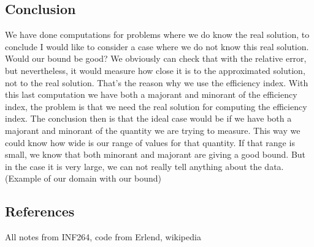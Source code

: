 \documentclass{article}
\begin{document}
	\subsection*{Conclusion}
	We have done computations for problems where we do know the real solution, to conclude I would like to consider a case where we do not know this real solution. Would our bound be good? We obviously can check that with the relative error, but nevertheless, it would measure how close it is to the approximated solution, not to the real solution. That's the reason why we use the efficiency index. With this last computation we have both a majorant and minorant of the efficiency index, the problem is that we need the real solution for computing the efficiency index. The conclusion then is that the ideal case would be if we have both a majorant and minorant of the quantity we are trying to measure. This way we could know how wide is our range of values for that quantity. If that range is small, we know that both minorant and majorant are giving a good bound. But in the case it is very large, we can not really tell anything about the data. (Example of our domain with our bound)
	\subsection*{References}
	All notes from INF264, code from Erlend, wikipedia
	
\end{document}
